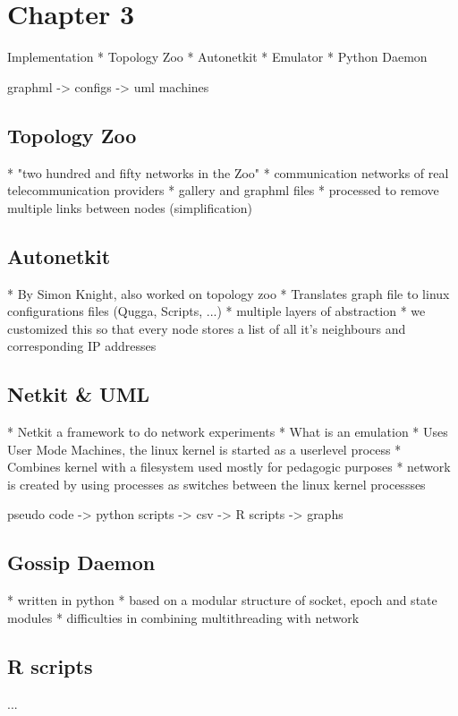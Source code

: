 \documentclass[11pt,a4paper]{article}
\begin{document}
\newpage

\section{Chapter 3}
Implementation
* Topology Zoo
* Autonetkit
* Emulator
* Python Daemon

graphml -> configs -> uml machines
\subsection{Topology Zoo}
* "two hundred and fifty networks in the Zoo"
* communication networks of real telecommunication providers
* gallery and graphml files
* processed to remove multiple links between nodes (simplification)

\subsection{Autonetkit}
* By Simon Knight, also worked on topology zoo
* Translates graph file to linux configurations files (Qugga, Scripts, ...)
* multiple layers of abstraction
* we customized this so that every node stores a list of all it's neighbours and corresponding IP addresses

\subsection{Netkit & UML}
* Netkit a framework to do network experiments
* What is an emulation
* Uses User Mode Machines, the linux kernel is started as a userlevel process
* Combines kernel with a filesystem used mostly for pedagogic purposes
* network is created by using processes as switches between the linux kernel processses

pseudo code -> python scripts -> csv -> R scripts -> graphs
\subsection{Gossip Daemon}
* written in python
* based on a modular structure of socket, epoch and state modules
* difficulties in combining multithreading with network

\subsection{R scripts}
...
\end{document}
